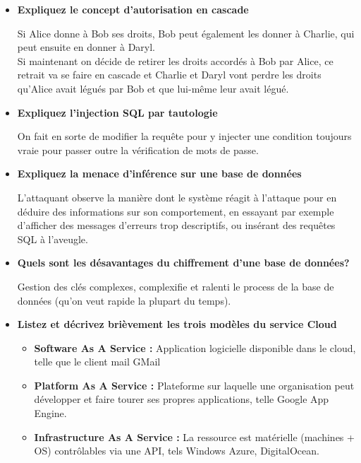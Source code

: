 \documentclass{report}
\begin{document}
			\begin{itemize}
				\item \textbf{Expliquez le concept d'autorisation en cascade}

					Si Alice donne à Bob ses droits, Bob peut également les donner à Charlie, qui peut ensuite en donner à Daryl.\\
					Si maintenant on décide de retirer les droits accordés à Bob par Alice, ce retrait va se faire en cascade et Charlie et Daryl vont perdre les droits qu'Alice avait légués par Bob et que lui-même leur avait légué.\\

				\item \textbf{Expliquez l'injection SQL par tautologie}

					On fait en sorte de modifier la requête pour y injecter une condition toujours vraie pour passer outre la vérification de mots de passe.\\

				\item \textbf{Expliquez la menace d'inférence sur une base de données}

					L'attaquant observe la manière dont le système réagit à l'attaque pour en déduire des informations sur son comportement, en essayant par exemple d'afficher des messages d'erreurs trop descriptifs, ou insérant des requêtes SQL à l'aveugle.\\

				\item \textbf{Quels sont les désavantages du chiffrement d'une base de données?}

					Gestion des clés complexes, complexifie et ralenti le process de la base de données (qu'on veut rapide la plupart du temps).

				\item \textbf{Listez et décrivez brièvement les trois modèles du service Cloud}

					\begin{itemize}
						\item \textbf{Software As A Service : } Application logicielle disponible dans le cloud, telle que le client mail GMail
						\item \textbf{Platform As A Service : } Plateforme sur laquelle une organisation peut développer et faire tourer ses propres applications, telle Google App Engine.
						\item \textbf{Infrastructure As A Service : } La ressource est matérielle (machines + OS) contrôlables via une API, tels Windows Azure, DigitalOcean.\\
					\end{itemize}


\end{itemize}
\end{document}
